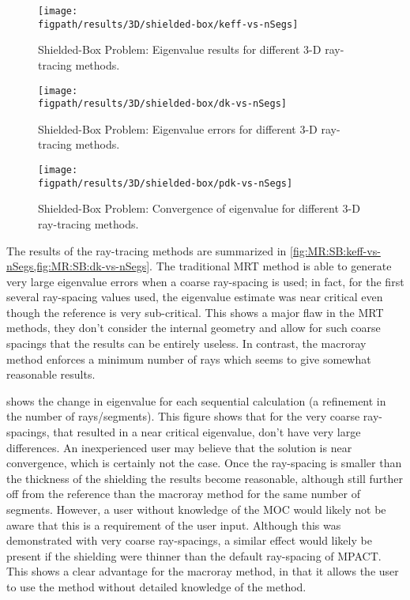 {{{      \begin{figure}[hp]
        \centering
        \texttt{[image: \\figpath/results/3D/shielded-box/keff-vs-nSegs]}
        \caption{Shielded-Box Problem: Eigenvalue results for different 3-D ray-tracing methods. \label{fig:MR:SB:keff-vs-nSegs}}
      \end{figure}
      \begin{figure}[hp]
        \centering
        \texttt{[image: \\figpath/results/3D/shielded-box/dk-vs-nSegs]}
        \caption{Shielded-Box Problem: Eigenvalue errors for different 3-D ray-tracing methods. \label{fig:MR:SB:dk-vs-nSegs}}
      \end{figure}
      \begin{figure}[hp]
        \centering
        \texttt{[image: \\figpath/results/3D/shielded-box/pdk-vs-nSegs]}
        \caption{Shielded-Box Problem: Convergence of eigenvalue for different 3-D ray-tracing methods. \label{fig:MR:SB:pdk-vs-nSegs}}
      \end{figure}

      The results of the ray-tracing methods are summarized in \cref{fig:MR:SB:keff-vs-nSegs,fig:MR:SB:dk-vs-nSegs}.
      The traditional \ac{MRT} method is able to generate very large eigenvalue errors when a coarse ray-spacing is used;
        in fact, for the first several ray-spacing values used, the eigenvalue estimate was near critical even though the reference is very sub-critical.
      This shows a major flaw in the \ac{MRT} methods, they don't consider the internal geometry and allow for such coarse spacings that the results can be entirely useless.
      In contrast, the macroray method enforces a minimum number of rays which seems to give somewhat reasonable results.

       shows the change in eigenvalue for each sequential calculation (a refinement in the number of rays/segments).
      This figure shows that for the very coarse ray-spacings, that resulted in a near critical eigenvalue, don't have very large differences.
      An inexperienced user may believe that the solution is near convergence, which is certainly not the case.
      Once the ray-spacing is smaller than the thickness of the shielding the results become reasonable, although still further off from the reference than the macroray method for the same number of segments.
      However, a user without knowledge of the \ac{MOC} would likely not be aware that this is a requirement of the user input.
      Although this was demonstrated with very coarse ray-spacings, a similar effect would likely be present if the shielding were thinner than the default ray-spacing of MPACT.
      This shows a clear advantage for the macroray method, in that it allows the user to use the method without detailed knowledge of the method.
    }

}}
